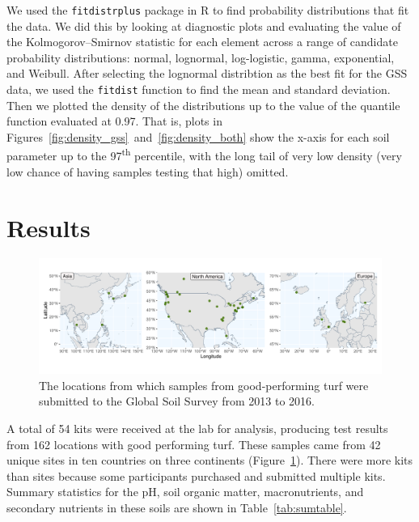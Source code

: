\documentclass[12pt, a4paper, titlepage]{article}
\begin{document}
We used the \texttt{fitdistrplus} package \parencite{fitdist} in R \parencite{r2020} to find probability distributions that fit the data. We did this by looking at diagnostic plots and evaluating the value of the Kolmogorov–Smirnov statistic for each element across a range of candidate probability distributions: normal, lognormal, log-logistic, gamma, exponential, and Weibull. After selecting the lognormal distribtion as the best fit for the GSS data, we used the \texttt{fitdist} function to find the mean and standard deviation. Then we plotted the density of the distributions up to the value of the quantile function evaluated at 0.97. That is, plots in Figures~\ref{fig:density_gss}~and~\ref{fig:density_both} show the x-axis for each soil parameter up to the 97\textsuperscript{th} percentile, with the long tail of very low density (very low chance of having samples testing that high) omitted. 
 
\section*{Results}

 \begin{figure}
    \centering
    \includegraphics[width=1.01\linewidth]{fig1_gss_locs.pdf}
    \caption{The locations from which samples from good-performing turf were submitted to the Global Soil Survey from 2013 to 2016.}
    \label{fig:locs}
  \end{figure}

A total of 54 kits were received at the lab for analysis, producing test results from 162 locations with good performing turf. These samples came from 42 unique sites in ten countries on three continents (Figure~\ref{fig:locs}). There were more kits than sites because some participants purchased and submitted multiple kits. Summary statistics for the pH, soil organic matter, macronutrients, and secondary nutrients in these soils are shown in Table~\ref{tab:sumtable}.
\end{document}
